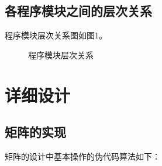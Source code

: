 \documentclass{article}
\begin{document}
\subsection{各程序模块之间的层次关系}

程序模块层次关系图如图1。

\begin{figure}[htbp]


    \caption{程序模块层次关系}

\end{figure}

\section{详细设计}

\subsection{矩阵的实现}

矩阵的设计中基本操作的伪代码算法如下：
\end{document}
